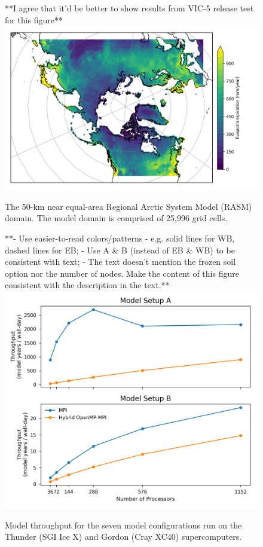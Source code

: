 \documentclass[gmd, manuscript]{copernicus}
\begin{document}
\clearpage
\begin{figure}[t]
**I agree that it'd be better to show results from VIC-5 release test for this figure**
\includegraphics[width=6in]{RASM_domain_fig.png}
\caption{The 50-km near equal-area Regional Arctic System Model (RASM) domain. The model domain is comprised of 25,996 grid cells. }
\label{fig:vic_domain}
\end{figure}

\clearpage
\begin{figure}[t]
**- Use easier-to-read colors/patterns - e.g. solid lines for WB, dashed lines for EB;
- Use A & B (instead of EB & WB) to be consistent with text;
- The text doesn't mention the frozen soil option nor the number of nodes. Make the content of this figure consistent with the description in the text.**
\includegraphics[width=6in]{VIC_scaling.png}
\caption{Model throughput for the seven model configurations run on the Thunder (SGI Ice X) and Gordon (Cray XC40) supercomputers.}
\label{fig:vic_scaling}
\end{figure}
\end{document}
